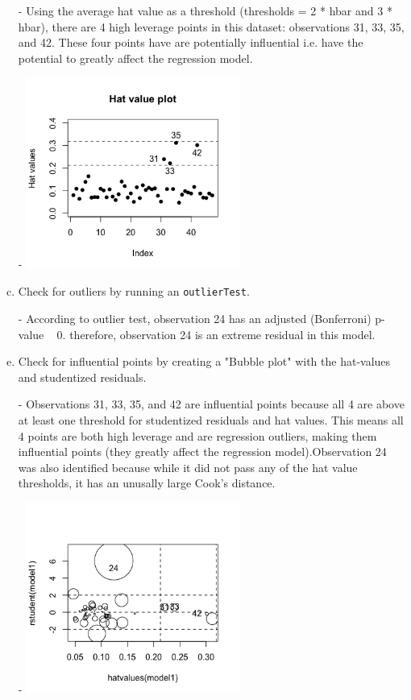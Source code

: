 \documentclass[12pt,letterpaper]{article}
\begin{document}
\begin{enumerate}[(a)]
	\item[-] Using the average hat value as a threshold (thresholds = 2 * hbar and 3 * hbar), there are 4 high leverage points in this dataset: observations 31, 33, 35, and 42. These four points have are potentially influential i.e. have the potential to greatly affect the regression model.
	\item [-]
	\includegraphics[width=7cm]{Hatvalueplot.png}
	\item Check for outliers by running an \texttt{outlierTest}. 
	\item [-] According to outlier test, observation 24 has an adjusted (Bonferroni) p-value ~ 0. therefore, observation 24 is an extreme residual in this model.
	\item Check for influential points by creating a "Bubble plot" with the hat-values and studentized residuals.
	
	\item [-] Observations 31, 33, 35, and 42 are influential points because all 4 are above at least one threshold for studentized residuals and hat values. This means all 4 points are both high leverage and are regression outliers, making them influential points (they greatly affect the regression model).Observation 24 was also identified because while it did not pass any of the hat value thresholds, it has an unusally large Cook's distance.
		\item [-]
	\includegraphics[width=7cm]{Bubble.png}
\end{enumerate}


\end{document}
